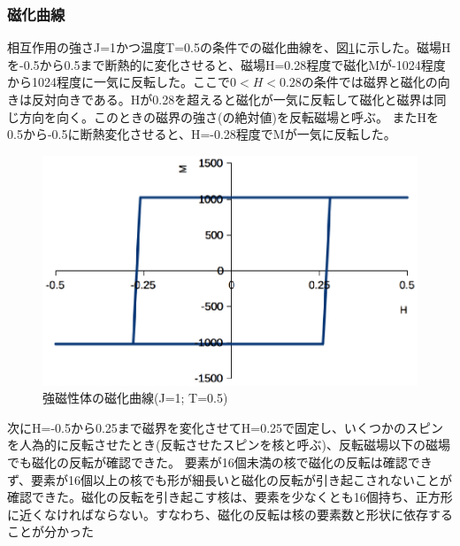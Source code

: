 \documentclass[11pt,a4]{jarticle}
\begin{document}
\subsubsection{磁化曲線}
相互作用の強さJ=1かつ温度T=0.5の条件での磁化曲線を、図\ref{fig:Ferromagnetism}に示した。磁場Hを-0.5から0.5まで断熱的に変化させると、磁場H=0.28程度で磁化Mが-1024程度から1024程度に一気に反転した。ここで$0<H<0.28$の条件では磁界と磁化の向きは反対向きである。Hが0.28を超えると磁化が一気に反転して磁化と磁界は同じ方向を向く。このときの磁界の強さ(の絶対値)を反転磁場と呼ぶ。
またHを0.5から-0.5に断熱変化させると、H=-0.28程度でMが一気に反転した。
\begin{figure}[htbp]
  \begin{center}
   \includegraphics[width=0.75\hsize]{Ferromagnetism.eps}
  \end{center}
  \caption{強磁性体の磁化曲線(J=1; T=0.5)}
  \label{fig:Ferromagnetism}
\end{figure}

次にH=-0.5から0.25まで磁界を変化させてH=0.25で固定し、いくつかのスピンを人為的に反転させたとき(反転させたスピンを核と呼ぶ)、反転磁場以下の磁場でも磁化の反転が確認できた。
要素が16個未満の核で磁化の反転は確認できず、要素が16個以上の核でも形が細長いと磁化の反転が引き起こされないことが確認できた。磁化の反転を引き起こす核は、要素を少なくとも16個持ち、正方形に近くなければならない。すなわち、磁化の反転は核の要素数と形状に依存することが分かった
\end{document}
